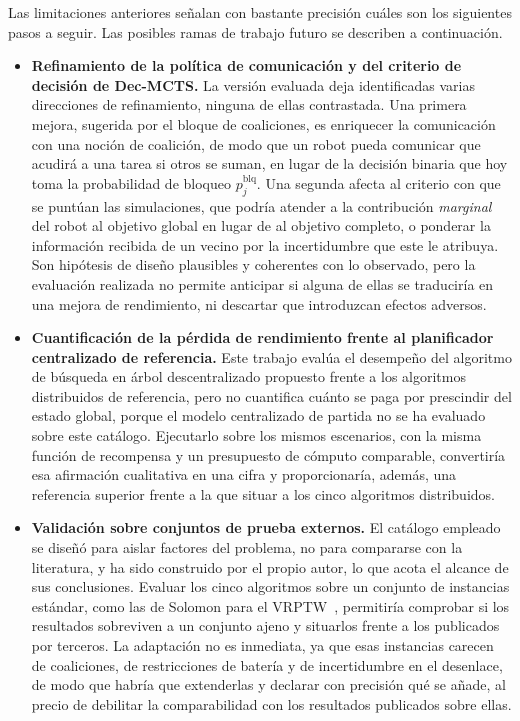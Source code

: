 Las limitaciones anteriores señalan con bastante precisión cuáles son los siguientes pasos a seguir. Las posibles ramas de trabajo futuro se describen a continuación.

\begin{itemize}
    \item \textbf{Refinamiento de la política de comunicación y del criterio de decisión de Dec-MCTS.} La versión evaluada deja identificadas varias direcciones de refinamiento, ninguna de ellas contrastada. Una primera mejora, sugerida por el bloque de coaliciones, es enriquecer la comunicación con una noción de coalición, de modo que un robot pueda comunicar que acudirá a una tarea si otros se suman, en lugar de la decisión binaria que hoy toma la probabilidad de bloqueo $p^{\mathrm{blq}}_j$. Una segunda afecta al criterio con que se puntúan las simulaciones, que podría atender a la contribución \emph{marginal} del robot al objetivo global en lugar de al objetivo completo, o ponderar la información recibida de un vecino por la incertidumbre que este le atribuya. Son hipótesis de diseño plausibles y coherentes con lo observado, pero la evaluación realizada no permite anticipar si alguna de ellas se traduciría en una mejora de rendimiento, ni descartar que introduzcan efectos adversos.

    \item \textbf{Cuantificación de la pérdida de rendimiento frente al planificador centralizado de referencia.} Este trabajo evalúa el desempeño del algoritmo de búsqueda en árbol descentralizado propuesto frente a los algoritmos distribuidos de referencia, pero no cuantifica cuánto se paga por prescindir del estado global, porque el modelo centralizado de partida  no se ha evaluado sobre este catálogo. Ejecutarlo sobre los mismos escenarios, con la misma función de recompensa y un presupuesto de cómputo comparable, convertiría esa afirmación cualitativa en una cifra y proporcionaría, además, una referencia superior frente a la que situar a los cinco algoritmos distribuidos.

    \item \textbf{Validación sobre conjuntos de prueba externos.} El catálogo empleado se diseñó para aislar factores del problema, no para compararse con la literatura, y ha sido construido por el propio autor, lo que acota el alcance de sus conclusiones. Evaluar los cinco algoritmos sobre un conjunto de instancias estándar, como las de Solomon para el VRPTW~\cite{solomon1987algorithms}, permitiría comprobar si los resultados sobreviven a un conjunto ajeno y situarlos frente a los publicados por terceros. La adaptación no es inmediata, ya que esas instancias carecen de coaliciones, de restricciones de batería y de incertidumbre en el desenlace, de modo que habría que extenderlas y declarar con precisión qué se añade, al precio de debilitar la comparabilidad con los resultados publicados sobre ellas.
\end{itemize}
